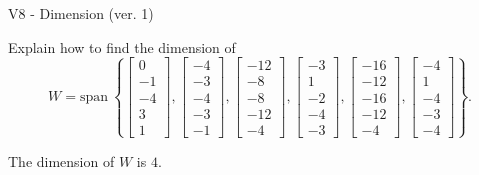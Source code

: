 \begin{exercise}
  \begin{exerciseTitle}V8 - Dimension (ver. 1)\end{exerciseTitle}
  \begin{exerciseStatement}
    Explain how to find the dimension of 
\[W=\mathrm{span}\ \left\{\left[\begin{array}{r}
0 \\
-1 \\
-4 \\
3 \\
1
\end{array}\right] , \left[\begin{array}{r}
-4 \\
-3 \\
-4 \\
-3 \\
-1
\end{array}\right] , \left[\begin{array}{r}
-12 \\
-8 \\
-8 \\
-12 \\
-4
\end{array}\right] , \left[\begin{array}{r}
-3 \\
1 \\
-2 \\
-4 \\
-3
\end{array}\right] , \left[\begin{array}{r}
-16 \\
-12 \\
-16 \\
-12 \\
-4
\end{array}\right] , \left[\begin{array}{r}
-4 \\
1 \\
-4 \\
-3 \\
-4
\end{array}\right]\right\}.\]



  \end{exerciseStatement}
  \begin{exerciseAnswer}
   The dimension of \(W\) is  \(4\).
  


  \end{exerciseAnswer}
\end{exercise}